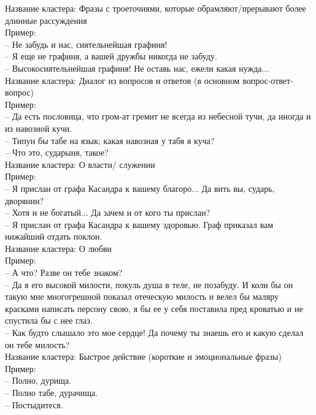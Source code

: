 \documentclass[a4paper,14pt]{article}
\begin{document}
Название кластера: Фразы с троеточиями, которые обрамляют/прерывают более длинные рассуждения\\
Пример: \\
-- Не забудь и нас, сиятельнейшая графиня! \\
-- Я еще не графиня, а вашей дружбы никогда не забуду. \\
-- Высокосиятельнейшая графиня! Не оставь нас, ежели какая нужда... \\



Название кластера: Диалог из вопросов и ответов (в основном вопрос-ответ-вопрос)\\
Пример: \\
-- Да есть пословица, что гром-ат гремит не всегда из небесной тучи, да иногда и из
              навозной кучи. \\
-- Типун бы табе на язык; какая навозная у табя я куча? \\
-- Что это, сударыня, такое? \\



Название кластера: О власти/ служении\\
Пример: \\
-- Я прислан от графа Касандра к вашему благоро... Да вить вы, сударь, дворянин? \\
-- Хотя и не богатый... Да зачем и от кого ты прислан? \\
-- Я прислан от графа Касандра к вашему здоровью. Граф приказал вам нижайший отдать
              поклон. \\



Название кластера: О любви\\
Пример: \\
-- А что? Разве он тебе знаком? \\
-- Да я его высокой милости, покуль душа в теле, не позабуду. И коли бы он такую мне
              многогрешной показал отеческую милость и велел бы маляру красками написать персону
              свою, я бы ее у себя поставила пред кроватью и не спустила бы с нее глаз. \\
-- Как будто слышало это мое сердце! Да почему ты знаешь его и какую сделал он тебе
              милость? \\



Название кластера: Быстрое действие (короткие и эмоциональные фразы)\\
Пример: \\
-- Полно, дурища. \\
-- Полно табе, дурачища. \\
-- Постыдитеся. \\
\end{document}
